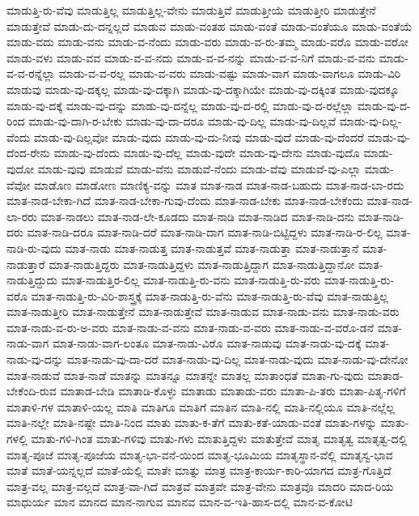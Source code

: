 {ಮಾಡುತ್ತಿ-ರು-ವೆವು
ಮಾಡುತ್ತಿಲ್ಲ
ಮಾಡುತ್ತಿಲ್ಲ-ವೇನು
ಮಾಡುತ್ತಿವೆ
ಮಾಡುತ್ತೀಯೆ
ಮಾಡುತ್ತೀರಿ
ಮಾಡುತ್ತೇನೆ
ಮಾಡುತ್ತೇವೆ
ಮಾಡು-ದು-ದನ್ನಲ್ಲದೆ
ಮಾಡುವ
ಮಾಡು-ವಂತಹ
ಮಾಡು-ವಂತೆ
ಮಾಡು-ವಂತೆಯೂ
ಮಾಡು-ವಂತೆಯೆ
ಮಾಡು-ವದು
ಮಾಡು-ವನು
ಮಾಡು-ವ-ನೆಂದು
ಮಾಡು-ವರು
ಮಾಡು-ವ-ರು-ತಮ್ಮ
ಮಾಡು-ವರೊ
ಮಾಡು-ವರೋ
ಮಾಡು-ವಳು
ಮಾಡು-ವವ
ಮಾಡು-ವ-ವ-ನದು
ಮಾಡು-ವ-ವ-ನನ್ನು
ಮಾಡು-ವ-ವ-ನಿಗೆ
ಮಾಡು-ವ-ವನು
ಮಾಡು-ವ-ವ-ರನ್ನೆಲ್ಲಾ
ಮಾಡು-ವ-ವ-ರಲ್ಲ
ಮಾಡು-ವ-ವರು
ಮಾಡು-ವಷ್ಟು
ಮಾಡು-ವಾಗ
ಮಾಡು-ವಾಗಲೂ
ಮಾಡು-ವಿರಿ
ಮಾಡುವು
ಮಾಡು-ವು-ದಕ್ಕಲ್ಲ
ಮಾಡು-ವು-ದಕ್ಕಾಗಿ
ಮಾಡು-ವು-ದಕ್ಕಾಗಿಯೇ
ಮಾಡು-ವು-ದಕ್ಕಿಂತ
ಮಾಡು-ವುದಕ್ಕೂ
ಮಾಡು-ವು-ದಕ್ಕೆ
ಮಾಡು-ವು-ದನ್ನು
ಮಾಡು-ವು-ದನ್ನೆಲ್ಲ
ಮಾಡು-ವು-ದ-ರಲ್ಲಿ
ಮಾಡು-ವು-ದ-ರಲ್ಲೆಲ್ಲಾ
ಮಾಡು-ವು-ದ-ರಿಂದ
ಮಾಡು-ವು-ದಾಗಿ-ರ-ಬೇಕು
ಮಾಡು-ವು-ದಾ-ದರೂ
ಮಾಡು-ವು-ದಿಲ್ಲ
ಮಾಡು-ವು-ದಿಲ್ಲವೆ
ಮಾಡು-ವು-ದಿಲ್ಲ-ವೆಂದು
ಮಾಡು-ವು-ದಿಲ್ಲವೋ
ಮಾಡು-ವುದು
ಮಾಡು-ವು-ದು-ನೀವು
ಮಾಡು-ವುದೆ
ಮಾಡು-ವು-ದೆಂದರೆ
ಮಾಡು-ವು-ದೆಂದ-ರೇನು
ಮಾಡು-ವು-ದೆಂದು
ಮಾಡು-ವು-ದೆಲ್ಲ
ಮಾಡು-ವುದೇ
ಮಾಡು-ವು-ದೇನು
ಮಾಡು-ವುದೊ
ಮಾಡು-ವುದೋ
ಮಾಡು-ವುವು
ಮಾಡುವೆ
ಮಾಡು-ವೆನು
ಮಾಡುವೆ-ನೆಂದು
ಮಾಡು-ವೆವು
ಮಾಡುವೆ-ವು-ಎಲ್ಲಾ
ಮಾಡು-ವೆವೋ
ಮಾಡೊಣ
ಮಾಡೋಣ
ಮಾಣಿಕ್ಯ-ವನ್ನು
ಮಾತ
ಮಾತ-ನಾಡ
ಮಾತ-ನಾಡ-ಬಹುದು
ಮಾತ-ನಾಡ-ಬಾ-ರದು
ಮಾತ-ನಾಡ-ಬೇಕಾ-ಗಿದೆ
ಮಾತ-ನಾಡ-ಬೇಕಾ-ಗುವು-ದೆಂದು
ಮಾತ-ನಾಡ-ಬೇಕು
ಮಾತ-ನಾಡ-ಬೇಕೆಂದು
ಮಾತ-ನಾಡ-ಲಾ-ರರು
ಮಾತ-ನಾಡಲು
ಮಾತ-ನಾಡ-ಲೇ-ಕೂಡದು
ಮಾತ-ನಾಡಿ
ಮಾತ-ನಾಡಿದ
ಮಾತ-ನಾಡಿ-ದನು
ಮಾತ-ನಾಡಿ-ದರು
ಮಾತ-ನಾಡಿ-ದರೂ
ಮಾತ-ನಾಡಿ-ದರೆ
ಮಾತ-ನಾಡಿ-ದಾಗ
ಮಾತ-ನಾಡಿ-ಬಿಟ್ಟಿದ್ದಳು
ಮಾತ-ನಾಡಿ-ರ-ಲಿಲ್ಲ
ಮಾತ-ನಾಡಿ-ರು-ವುದು
ಮಾತ-ನಾಡು
ಮಾತ-ನಾಡುತ್ತ
ಮಾತ-ನಾಡುತ್ತವೆ
ಮಾತ-ನಾಡುತ್ತಾ
ಮಾತ-ನಾಡುತ್ತಾನೆ
ಮಾತ-ನಾಡುತ್ತಾರೆ
ಮಾತ-ನಾಡುತ್ತಿದ್ದರು
ಮಾತ-ನಾಡುತ್ತಿದ್ದಳು
ಮಾತ-ನಾಡುತ್ತಿದ್ದಾಗ
ಮಾತ-ನಾಡುತ್ತಿದ್ದಾನೋ
ಮಾತ-ನಾಡುತ್ತಿದ್ದುದು
ಮಾತ-ನಾಡುತ್ತಿರ-ಲಿಲ್ಲ
ಮಾತ-ನಾಡುತ್ತಿ-ರು-ವನು
ಮಾತ-ನಾಡುತ್ತಿ-ರು-ವರು
ಮಾತ-ನಾಡುತ್ತಿ-ರು-ವರೊ
ಮಾತ-ನಾಡುತ್ತಿ-ರು-ವಿರಿ-ಶಾಸ್ತ್ರಕ್ಕೆ
ಮಾತ-ನಾಡುತ್ತಿ-ರು-ವೆನು
ಮಾತ-ನಾಡುತ್ತಿ-ರು-ವೆವು
ಮಾತ-ನಾಡುತ್ತಿಲ್ಲ
ಮಾತ-ನಾಡುತ್ತೀರಿ
ಮಾತ-ನಾಡುತ್ತೇನೆ
ಮಾತ-ನಾಡುತ್ತೇವೆ
ಮಾತ-ನಾಡುವ
ಮಾತ-ನಾಡು-ವನು
ಮಾತ-ನಾಡು-ವರು
ಮಾತ-ನಾಡು-ವ-ರು-ಅ-ವರು
ಮಾತ-ನಾಡು-ವ-ವನು
ಮಾತ-ನಾಡು-ವ-ವರು
ಮಾತ-ನಾಡು-ವ-ವರೊ-ಡನೆ
ಮಾತ-ನಾಡು-ವಾಗ
ಮಾತ-ನಾಡು-ವಾಗ-ಲಂತೂ
ಮಾತ-ನಾಡು-ವಿರೊ
ಮಾತ-ನಾಡುವು
ಮಾತ-ನಾಡು-ವು-ದಕ್ಕೆ
ಮಾತ-ನಾಡು-ವು-ದನ್ನು
ಮಾತ-ನಾಡು-ವು-ದಾ-ದರೆ
ಮಾತ-ನಾಡು-ವು-ದಿಲ್ಲ
ಮಾತ-ನಾಡು-ವುದು
ಮಾತ-ನಾಡು-ವು-ದೇನೋ
ಮಾತ-ನಾಡುವೆ
ಮಾತ-ನಾಡೆ
ಮಾತನ್ನು
ಮಾತನ್ನೂ
ಮಾತನ್ನೇ
ಮಾತಲ್ಲ
ಮಾತಾಂಧತೆ
ಮಾತಾ-ಗು-ವುದು
ಮಾತಾಡ-ಬೇಕೆಂದಿ-ರುವ
ಮಾತಾಡ-ಬೇಡಿ
ಮಾತಾಡಿ-ಕೊಳ್ಳು
ಮಾತಾಡು
ಮಾತಾಡು-ವರು
ಮಾತಾ-ಪಿ-ತರು
ಮಾತಾ-ಪಿತೃ-ಗಳಿಗೆ
ಮಾತಾಳಿ-ಗಳ
ಮಾತಾಳಿ-ಯಲ್ಲ
ಮಾತಿ
ಮಾತಿಗೂ
ಮಾತಿಗೆ
ಮಾತಿನ
ಮಾತಿ-ನಲ್ಲಿ
ಮಾತಿ-ನಲ್ಲಿಯೂ
ಮಾತಿ-ನಲ್ಲೆಲ್ಲ
ಮಾತಿ-ನಲ್ಲೇ
ಮಾತಿ-ನಷ್ಟೇ
ಮಾತಿ-ನಿಂದ
ಮಾತು
ಮಾತು-ಕ-ತೆಗೆ
ಮಾತು-ಕತೆ-ಯಾಡು-ವಂತೆ
ಮಾತು-ಗಳನ್ನು
ಮಾತು-ಗಳಲ್ಲಿ
ಮಾತು-ಗಳಿ-ಗಿಂತ
ಮಾತು-ಗಳಿವು
ಮಾತು-ಗಳು
ಮಾತುತ್ತಿದ್ದಳು
ಮಾತುತ್ತೇವೆ
ಮಾತೃ
ಮಾತೃತ್ವ
ಮಾತೃತ್ವ-ದಲ್ಲಿ
ಮಾತೃ-ಪೂಜೆ
ಮಾತೃ-ಪೂಜೆಯ
ಮಾತೃ-ಭಾ-ವನೆ-ಯಿಂದ
ಮಾತೃ-ಭೂಮಿಯ
ಮಾತೃಸ್ಥಾನ-ವೆಲ್ಲಿ
ಮಾತೃಸ್ವ-ಭಾವ
ಮಾತೆ
ಮಾತೆ-ಯನ್ನಲ್ಲದೆ
ಮಾತೆ-ಯೆಲ್ಲಿ
ಮಾತೇ
ಮಾತ್ನು
ಮಾತ್ರ
ಮಾತ್ರ-ಕಾರ್ಯ-ಕಾರಿ-ಯಾಗದ
ಮಾತ್ರ-ಗೊತ್ತಿದೆ
ಮಾತ್ರ-ವಲ್ಲ
ಮಾತ್ರ-ವಲ್ಲದೆ
ಮಾತ್ರ-ವಾ-ಗಿದೆ
ಮಾತ್ರವೆ
ಮಾತ್ರವೇ
ಮಾತ್ರ-ವೇನು
ಮಾತ್ರವೊ
ಮಾದರಿ
ಮಾದ-ರಿಯ
ಮಾಧುರ್ಯ
ಮಾನ
ಮಾನದ
ಮಾನ-ನಾಗುವ
ಮಾನವ
ಮಾನ-ವ-ಇತಿ-ಹಾಸ-ದಲ್ಲಿ
ಮಾನ-ವ-ಕೋಟಿ
}
